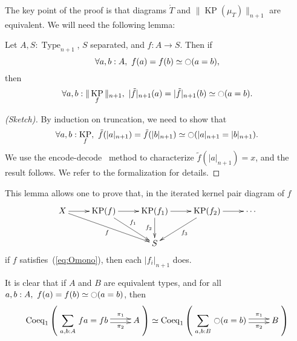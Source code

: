 \documentclass[notfinal]{jfrarticle}
\DeclareMathOperator{\Type}{Type}
\newcommand{\modal}{\ensuremath{\ocircle}}
\newcommand{\sumD}[3]{\sum_{#1:#2}\, #3}
\newcommand{\code}[1]{\texttt{#1}}
\DeclareMathOperator{\KP}{KP}
\begin{document}
The key point of the proof is that diagrams $\mathring T$ and $\|\KP(\mu_T)\|_{n+1}$
are equivalent.
We will need the following lemma:

\begin{lem}[\thethm\ (\code{OT\_Omono\_sep})]
\label{lem:Omono}
  Let $A,S:\Type_{n+1}$, $S$ separated, and $f:A \to S$. Then if 
  \begin{equation}
    \label{eq:Omono}
    \forall a,b:A,~f (a) = f (b) \simeq \modal (a=b),
  \end{equation}
  then
  \[\forall a,b:\|\KP_f\|_{n+1},~|\tilde f|_{n+1} (a) = |\tilde f|_{n+1} (b) \simeq \modal (a=b).\]
\end{lem}

\begin{proof}[(Sketch)]
  By induction on truncation, we need to show that 
  \[\forall a,b:\KP_f,~\tilde f (|a|_{n+1}) = \tilde f (|b|_{n+1} )\simeq
  \modal (|a|_{n+1}=|b|_{n+1}).\]%
  We use the encode-decode~\cite[Section 8.9]{hottbook} method to characterize $\tilde f (|a|_{n+1})
  = x$, and the result follows. We refer to the formalization for details.
\end{proof}

This lemma allows one to prove that, in the iterated kernel pair diagram
of $f$
\[
  \xymatrix{
    X \ar[r] \ar[rrd]_f & \KP(f) \ar[r] \ar[rd]^{f_1} & \KP(f_1)
    \ar[r] \ar[d]_{f_2} & \KP(f_2) \ar[r] \ar[ld]^{f_3}& \cdots \\
    && S &&
  }
\]
if $f$ satisfies~(\ref{eq:Omono}), then each $|f_i|_{n+1}$ does.

\begin{rmq}
It is clear that if $A$ and $B$ are equivalent types, and for all $a,b:A,~f (a) = f (b) \simeq \modal
(a=b)$, then 
\[
    \mathrm{Coeq}_1 \left( 
      \xymatrix{
        \displaystyle{\sumD {a,b} A {f a = f b}} \ar@<-.5ex>[r]_-{\pi_2} \ar@<.5ex>[r]^-{\pi_1} & A
      }
    \right)
    \simeq \mathrm{Coeq}_1 \left( 
      \xymatrix{\displaystyle{\sumD {a,b} B {\modal (a=b)}} \ar@<-.5ex>[r]_-{\pi_2} \ar@<.5ex>[r]^-{\pi_1} & B}
    \right)
  \]
\end{rmq}
\end{document}
